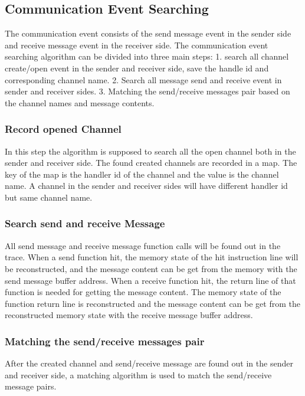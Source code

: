 \subsection{Communication Event Searching}
The communication event consists of the send message event in the sender side and receive message event in the receiver side. The communication event searching algorithm can be divided into three main steps: 1. search all channel create/open event in the sender and receiver side, save the handle id and corresponding channel name. 2. Search all message send and receive event in sender and receiver sides. 3. Matching the send/receive messages pair based on the channel names and message contents.
\subsubsection{Record opened Channel}
In this step the algorithm is supposed to search all the open channel both in the sender and receiver side. The found created channels are recorded in a map. The key of the map is the handler id of the channel and the value is the channel name. A channel in the sender and receiver sides will have different handler id but same channel name.
\subsubsection{Search send and receive Message}
All send message and receive message function calls will be found out in the trace. When a send function hit, the memory state of the hit instruction line will be reconstructed, and the message content can be get from the memory with the send message buffer address. When a receive function hit, the return line of that function is needed for getting the message content. The memory state of the function return line is reconstructed and the message content can be get  from the reconstructed memory state with the receive message buffer address.
\subsubsection{Matching the send/receive messages pair}
After the created channel and send/receive message are found out in the sender and receiver side, a matching algorithm is used to match the send/receive message pairs.
